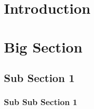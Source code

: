 


\section{Introduction}


\section{Big Section}


\subsection{Sub Section 1}


\subsubsection{Sub Sub Section 1}


